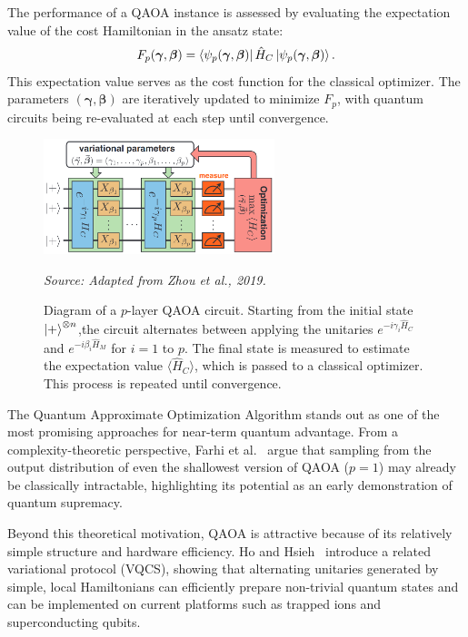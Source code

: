 The performance of a QAOA instance is assessed by evaluating the expectation value of the cost Hamiltonian in the ansatz state:
\begin{equation}
    F_p (\bm{\gamma}, \bm{\beta}) = \bra{\psi_p (\bm{\gamma}, \bm{\beta})} \hat{H}_C \ket{\psi_p (\bm{\gamma}, \bm{\beta})}.
    \label{eq:cost_function}
\end{equation}
This expectation value serves as the cost function for the classical optimizer. The parameters $(\bm{\gamma}, \bm{\beta})$ are iteratively updated to minimize $F_p$, with quantum circuits being re-evaluated at each step until convergence.

\begin{figure}[h]
    \centering
    \includegraphics[width=0.6\textwidth]{01-introduction/figs/qaoa.png}
    \caption{Diagram of a $p$-layer QAOA circuit. Starting from the initial state $\ket{+}^{\otimes n}$,the circuit alternates between applying the unitaries $e^{-i \gamma_i \hat{H}_C}$ and $e^{-i \beta_i \hat{H}_M}$ for $i = 1$ to $p$. The final state is measured to estimate the expectation value $\langle \hat{H}_C \rangle$, which is passed to a classical optimizer. This process is repeated until convergence.}
    \vspace{0.3em}
    \small\textit{Source: Adapted from Zhou et al., 2019.~\cite{zhou_quantum_2020}}
    \label{fig:qaoa}
\end{figure}

The Quantum Approximate Optimization Algorithm stands out as one of the most promising approaches for near-term quantum advantage. From a complexity-theoretic perspective, Farhi et al.~\cite{farhi_quantum_2019} argue that sampling from the output distribution of even the shallowest version of QAOA ($p=1$) may already be classically intractable, highlighting its potential as an early demonstration of quantum supremacy.

Beyond this theoretical motivation, QAOA is attractive because of its relatively simple structure and hardware efficiency. Ho and Hsieh~\cite{ho_efficient_2019} introduce a related variational protocol (VQCS), showing that alternating unitaries generated by simple, local Hamiltonians can efficiently prepare non-trivial quantum states and can be implemented on current platforms such as trapped ions and superconducting qubits.


